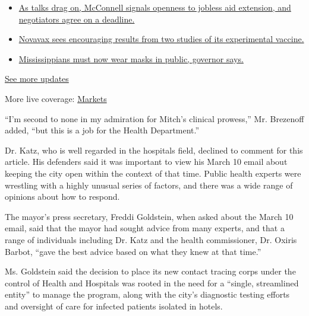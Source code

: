 \begin{itemize}
\tightlist
\item
  \href{https://www.nytimes3xbfgragh.onion/2020/08/04/world/coronavirus-cases.html?action=click\&pgtype=Article\&state=default\&region=MAIN_CONTENT_1\&context=storylines_live_updates\#link-762df92}{As
  talks drag on, McConnell signals openness to jobless aid extension,
  and negotiators agree on a deadline.}
\item
  \href{https://www.nytimes3xbfgragh.onion/2020/08/04/world/coronavirus-cases.html?action=click\&pgtype=Article\&state=default\&region=MAIN_CONTENT_1\&context=storylines_live_updates\#link-1228a480}{Novavax
  sees encouraging results from two studies of its experimental
  vaccine.}
\item
  \href{https://www.nytimes3xbfgragh.onion/2020/08/04/world/coronavirus-cases.html?action=click\&pgtype=Article\&state=default\&region=MAIN_CONTENT_1\&context=storylines_live_updates\#link-794484ed}{Mississippians
  must now wear masks in public, governor says.}
\end{itemize}

\href{https://www.nytimes3xbfgragh.onion/2020/08/04/world/coronavirus-cases.html?action=click\&pgtype=Article\&state=default\&region=MAIN_CONTENT_1\&context=storylines_live_updates}{See
more updates}

More live coverage:
\href{https://www.nytimes3xbfgragh.onion/live/2020/08/04/business/stock-market-today-coronavirus?action=click\&pgtype=Article\&state=default\&region=MAIN_CONTENT_1\&context=storylines_live_updates}{Markets}

``I'm second to none in my admiration for Mitch's clinical prowess,''
Mr. Brezenoff added, ``but this is a job for the Health Department.''

Dr. Katz, who is well regarded in the hospitals field, declined to
comment for this article. His defenders said it was important to view
his March 10 email about keeping the city open within the context of
that time. Public health experts were wrestling with a highly unusual
series of factors, and there was a wide range of opinions about how to
respond.

The mayor's press secretary, Freddi Goldstein, when asked about the
March 10 email, said that the mayor had sought advice from many experts,
and that a range of individuals including Dr. Katz and the health
commissioner, Dr. Oxiris Barbot, ``gave the best advice based on what
they knew at that time.''

Ms. Goldstein said the decision to place its new contact tracing corps
under the control of Health and Hospitals was rooted in the need for a
``single, streamlined entity'' to manage the program, along with the
city's diagnostic testing efforts and oversight of care for infected
patients isolated in hotels.

